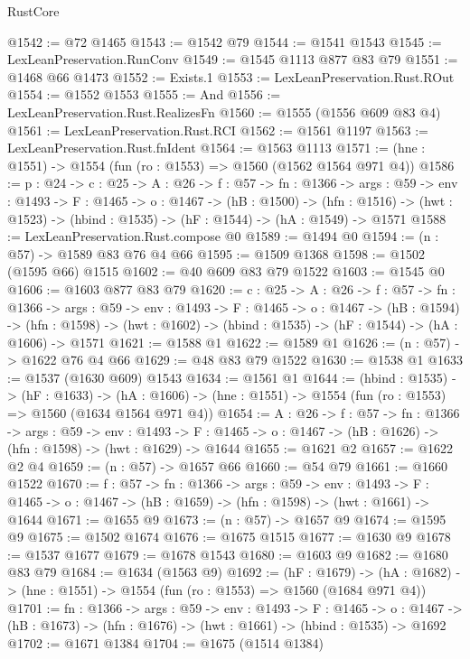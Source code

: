 \begin{lexlean}{RustCore}
\begin{coremodule}
@1542 := @72 @1465
@1543 := @1542 @79
@1544 := @1541 @1543
@1545 := LexLeanPreservation.RunConv
@1549 := @1545 @1113 @877 @83 @79
@1551 := @1468 @66 @1473
@1552 := Exists.{1}
@1553 := LexLeanPreservation.Rust.ROut
@1554 := @1552 @1553
@1555 := And
@1556 := LexLeanPreservation.Rust.RealizesFn
@1560 := @1555 (@1556 @609 @83 @4)
@1561 := LexLeanPreservation.Rust.RCI
@1562 := @1561 @1197
@1563 := LexLeanPreservation.Rust.fnIdent
@1564 := @1563 @1113
@1571 := (hne : @1551) -> @1554 (fun (ro : @1553) => @1560 (@1562 @1564 @971 @4))
@1586 := {p : @24} ->
  {c : @25} ->
  {A : @26} ->
  {f : @57} ->
  {fn : @1366} ->
  {args : @59} ->
  {env : @1493} ->
  {F : @1465} ->
  {o : @1467} ->
  (hB : @1500) ->
  (hfn : @1516) -> (hwt : @1523) -> (hbind : @1535) -> (hF : @1544) -> (hA : @1549) -> @1571
@1588 := LexLeanPreservation.Rust.compose @0
@1589 := @1494 @0
@1594 := (n : @57) -> @1589 @83 @76 @4 @66
@1595 := @1509 @1368
@1598 := @1502 (@1595 @66) @1515
@1602 := @40 @609 @83 @79 @1522
@1603 := @1545 @0
@1606 := @1603 @877 @83 @79
@1620 := {c : @25} ->
  {A : @26} ->
  {f : @57} ->
  {fn : @1366} ->
  {args : @59} ->
  {env : @1493} ->
  {F : @1465} ->
  {o : @1467} ->
  (hB : @1594) ->
  (hfn : @1598) -> (hwt : @1602) -> (hbind : @1535) -> (hF : @1544) -> (hA : @1606) -> @1571
@1621 := @1588 @1
@1622 := @1589 @1
@1626 := (n : @57) -> @1622 @76 @4 @66
@1629 := @48 @83 @79 @1522
@1630 := @1538 @1
@1633 := @1537 (@1630 @609) @1543
@1634 := @1561 @1
@1644 := (hbind : @1535) ->
  (hF : @1633) ->
  (hA : @1606) -> (hne : @1551) -> @1554 (fun (ro : @1553) => @1560 (@1634 @1564 @971 @4))
@1654 := {A : @26} ->
  {f : @57} ->
  {fn : @1366} ->
  {args : @59} ->
  {env : @1493} ->
  {F : @1465} -> {o : @1467} -> (hB : @1626) -> (hfn : @1598) -> (hwt : @1629) -> @1644
@1655 := @1621 @2
@1657 := @1622 @2 @4
@1659 := (n : @57) -> @1657 @66
@1660 := @54 @79
@1661 := @1660 @1522
@1670 := {f : @57} ->
  {fn : @1366} ->
  {args : @59} ->
  {env : @1493} ->
  {F : @1465} -> {o : @1467} -> (hB : @1659) -> (hfn : @1598) -> (hwt : @1661) -> @1644
@1671 := @1655 @9
@1673 := (n : @57) -> @1657 @9
@1674 := @1595 @9
@1675 := @1502 @1674
@1676 := @1675 @1515
@1677 := @1630 @9
@1678 := @1537 @1677
@1679 := @1678 @1543
@1680 := @1603 @9
@1682 := @1680 @83 @79
@1684 := @1634 (@1563 @9)
@1692 := (hF : @1679) ->
  (hA : @1682) -> (hne : @1551) -> @1554 (fun (ro : @1553) => @1560 (@1684 @971 @4))
@1701 := {fn : @1366} ->
  {args : @59} ->
  {env : @1493} ->
  {F : @1465} ->
  {o : @1467} -> (hB : @1673) -> (hfn : @1676) -> (hwt : @1661) -> (hbind : @1535) -> @1692
@1702 := @1671 @1384
@1704 := @1675 (@1514 @1384)

\end{coremodule}
\end{lexlean}
